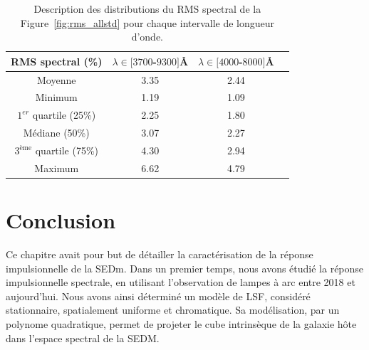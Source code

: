 \documentclass[../main/main.tex]{subfiles}
\begin{document}
\begin{table}[ht]
  \centerfloat
  \renewcommand{\arraystretch}{1.4}
  \caption[Description des distributions du RMS spectral des
  calibrations en flux.]{Description des distributions du RMS spectral de la
    Figure~\ref{fig:rms_allstd} pour chaque intervalle de longueur d'onde.}
  \label{tab:rms_allstd_detail}
  \begin{threeparttable}
    \begin{tabular}{cccc}
      \toprule
      \textbf{RMS spectral (\%)} & $\lambda \in [3700$-$9300]$\AA & $\lambda \in [4000$-$8000]$\AA   \\
      \midrule
      Moyenne  &                                       3.35 &                                       2.44 \\
      Minimum   &                                       1.19 &                                       1.09  \\
      $1^{er}$ quartile (25\%)   &                                       2.25 &                                       1.80 \\
      Médiane (50\%)   &                                       3.07 &                                       2.27 \\
      $3^{\text{ème}}$ quartile (75\%)   &                                       4.30 &                                       2.94  \\
      Maximum   &                                       6.62 &                                       4.79  \\
      \bottomrule
    \end{tabular}

  \end{threeparttable}
\end{table}
\clearpage
\section*{Conclusion}
Ce chapitre avait pour but de détailler la caractérisation de la réponse
impulsionnelle de la SEDm. Dans un premier temps, nous avons
étudié la réponse impulsionnelle spectrale, en utilisant l'observation de
lampes à arc entre 2018 et aujourd'hui. Nous avons ainsi déterminé un
modèle de LSF, considéré stationnaire,
spatialement uniforme et chromatique. Sa modélisation, par un
polynome quadratique, permet de projeter le cube intrinsèque de la galaxie
hôte dans l'espace spectral de la SEDM.
\end{document}
